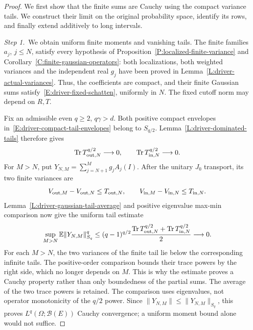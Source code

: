 \begin{proof}
  We first show that the finite sums are Cauchy using the compact variance
  tails. We construct their limit on the original probability space, identify
  its rows, and finally extend additively to long intervals.

  \medskip
  \noindent\textit{Step 1.~}We obtain uniform finite moments and vanishing
  tails.
  The finite families $a_j$, $j \le N$, satisfy every hypothesis of
  Proposition~\ref{P:localized-finite-variance} and
  Corollary~\ref{C:finite-gaussian-operators}: both localizations, both weighted
  variances and the independent real $g_j$ have been proved in
  Lemma~\ref{L:driver-actual-variances}. Thus, the coefficients are compact, and
  their finite Gaussian sums satisfy~\eqref{E:driver-fixed-schatten}, uniformly
  in $N$. The fixed cutoff norm may depend on $R,T$.

  Fix an admissible even $q \ge 2$, $q\gamma > d$. Both positive compact
  envelopes in~\eqref{E:driver-compact-tail-envelopes} belong to $S_{q/2}$.
  Lemma~\ref{L:driver-dominated-tails} therefore gives
  \[
    \operatorname{Tr}T_{{\rm out},N}^{q/2}\longrightarrow0,
    \qquad
    \operatorname{Tr}T_{{\rm in},N}^{q/2}\longrightarrow0.
  \]
  For $M > N$, put $Y_{N,M} = \sum_{j=N+1}^Mg_jA_j(I)$. After the unitary $J_0$
  transport, its two finite variances are
  \[
    V_{{\rm out},M}-V_{{\rm out},N}\le T_{{\rm out},N},\qquad
    V_{{\rm in},M}-V_{{\rm in},N}\le T_{{\rm in},N}.
  \]
  Lemma~\ref{L:driver-gaussian-tail-average} and positive eigenvalue max-min
  comparison now give the uniform tail estimate
  \[
    \sup_{M>N}\mathbb{E}\|Y_{N,M}\|_{S_q}^q
    \le(q-1)^{q/2}
    \frac{\operatorname{Tr}T_{{\rm out},N}^{q/2}
    +\operatorname{Tr}T_{{\rm in},N}^{q/2}}2
    \longrightarrow0.
  \]
  For each $M > N$, the two variances of the finite tail lie below the
  corresponding infinite tails. The positive-order comparison bounds their
  trace powers by the right side, which no longer depends on $M$. This is why
  the estimate proves a Cauchy property rather than only boundedness of the
  partial sums.
  The average of the two trace powers is retained. The comparison uses
  eigenvalues, not operator monotonicity of the $q/2$ power. Since $\|Y_{N,M}\|
  \le \|Y_{N,M}\|_{S_q}$, this proves $L^q(\Omega;\mathcal{B}(E))$ Cauchy
  convergence; a uniform moment bound alone would not suffice.


\end{proof}
